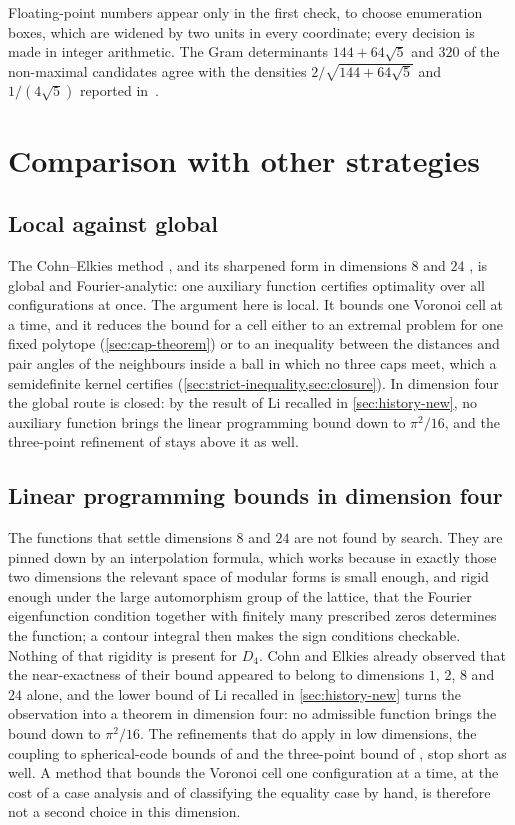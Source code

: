 \documentclass[11pt,reqno]{amsart}
\renewcommand{\_}{\origunderscore\allowbreak}
\numberwithin{equation}{section}
\theoremstyle{plain}
\theoremstyle{definition}
\theoremstyle{remark}
\begin{document}
Floating-point numbers appear only in the first check, to choose enumeration boxes, which are widened by two units in every coordinate; every decision is made in integer arithmetic. The Gram determinants $144+64\sqrt5$ and $320$ of the non-maximal candidates agree with the densities $2/\sqrt{144+64\sqrt5}$ and $1/(4\sqrt5)$ reported in~\cite[\S4.2]{AK2020}.


\section{Comparison with other strategies}\label{sec:comparison-methods}

\subsection{Local against global}

The Cohn--Elkies method \cite{CE03}, and its sharpened form in dimensions
$8$ and $24$ \cite{Via17,CKM17}, is global and Fourier-analytic: one
auxiliary function certifies optimality over all configurations at once.
The argument here is local. It bounds one Voronoi cell at a time, and it
reduces the bound for a cell either to an extremal problem for one fixed
polytope (\cref{sec:cap-theorem}) or to an inequality between the distances
and pair angles of the neighbours inside a ball in which no three caps meet,
which a semidefinite kernel certifies
(\cref{sec:strict-inequality,sec:closure}). In dimension four the global
route is closed: by the result of Li \cite{Li25} recalled in
\cref{sec:history-new}, no auxiliary function brings the linear programming
bound down to $\pi^2/16$, and the three-point refinement of
\cite{CdLS22} stays above it as well.

\subsection{Linear programming bounds in dimension four}

The functions that settle dimensions $8$ and $24$ are not found by search.
They are pinned down by an interpolation formula, which works because in
exactly those two dimensions the relevant space of modular forms is small
enough, and rigid enough under the large automorphism group of the lattice,
that the Fourier eigenfunction condition together with finitely many
prescribed zeros determines the function; a contour integral then makes the
sign conditions checkable. Nothing of that rigidity is present for $D_4$.
Cohn and Elkies \cite{CE03} already observed that the near-exactness of
their bound appeared to belong to dimensions $1$, $2$, $8$ and $24$ alone,
and the lower bound of Li recalled in \cref{sec:history-new} turns the
observation into a theorem in dimension four: no admissible function
brings the bound down to $\pi^2/16$. The refinements that do apply in low
dimensions, the coupling to spherical-code bounds of \cite{CZ14} and the
three-point bound of \cite{CdLS22}, stop short as well. A method that
bounds the Voronoi cell one configuration at a time, at the cost of a case
analysis and of classifying the equality case by hand, is therefore not a
second choice in this dimension.
\end{document}
